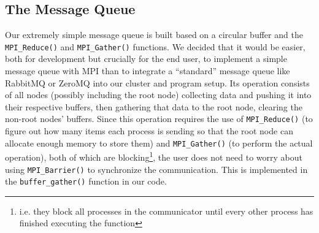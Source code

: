 \documentclass[11pt]{article}
\begin{document}
\subsection*{The Message Queue}
Our extremely simple message queue is built based on a circular buffer and the \lstinline{MPI_Reduce()} and \lstinline{MPI_Gather()} functions. We decided that it would be easier, both for development but crucially for the end user, to implement a simple message queue with MPI than to integrate a ``standard'' message queue like RabbitMQ or ZeroMQ into our cluster and program setup. Its operation consists of all nodes (possibly including the root node) collecting data and pushing it into their respective buffers, then gathering that data to the root node, clearing the non-root nodes' buffers. Since this operation requires the use of \lstinline{MPI_Reduce()} (to figure out how many items each process is sending so that the root node can allocate enough memory to store them) and \lstinline{MPI_Gather()} (to perform the actual operation), both of which are blocking\footnote{i.e. they block all processes in the communicator until every other process has finished executing the function}, the user does not need to worry about using \lstinline{MPI_Barrier()} to synchronize the communication. This is implemented in the \lstinline{buffer_gather()} function in our code.
\end{document}
